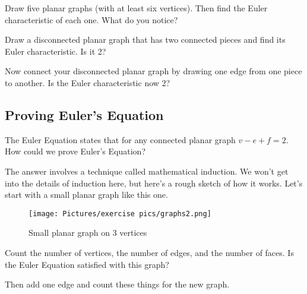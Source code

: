 \newpage

\begin{exercise}
Draw five planar graphs (with at least six vertices). Then find the Euler characteristic of each one. What do you notice?
\end{exercise}

\vspace{3in}

\begin{exercise}
Draw a disconnected planar graph that has two connected pieces and find its Euler characteristic. Is it 2?
\end{exercise}

\vspace{2in}

\begin{exercise}
Now connect your disconnected planar graph by drawing one edge from one piece to another. Is the Euler characteristic now 2?
\end{exercise}

\vspace{2in}

\subsection{Proving Euler's Equation}

The Euler Equation states that for any connected planar graph $v - e + f = 2$. How could we prove Euler’s Equation? 

\noindent The answer involves a technique called mathematical induction. We won’t get into the details of induction here, but here’s a rough sketch of how it works. Let’s start with a small planar graph like this one. 

\begin{figure}[h]
    \centering
    \texttt{[image: Pictures/exercise pics/graphs2.png]}
    \caption{Small planar graph on 3 vertices}
    \label{graph2}
\end{figure}

\newpage
\begin{exercise}
Count the number of vertices, the number of edges, and the number of faces. Is the Euler Equation satisfied with this graph? 
\end{exercise}

\vspace{1in}

\begin{exercise}
Then add one edge and count these things for the new graph.
\end{exercise}

